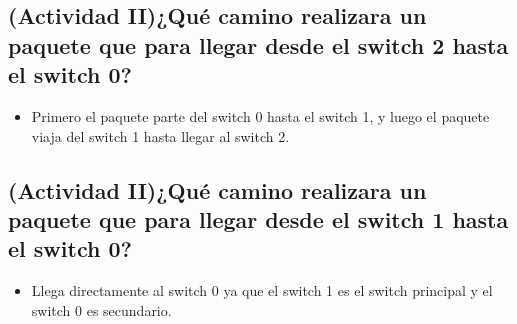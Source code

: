 \documentclass[spanish]{udpreport}
\begin{document}
\subsection{(Actividad II)¿Qué camino realizara un paquete que para llegar desde el switch
2 hasta el switch 0?}
\begin{itemize}
\item Primero el paquete parte del switch 0 hasta el switch 1, y luego el paquete viaja del switch 1 hasta llegar al switch 2.
\end{itemize}
\subsection{(Actividad II)¿Qué camino realizara un paquete que para llegar desde el switch
1 hasta el switch 0?}
\begin{itemize}
\item Llega directamente al switch 0 ya que el switch 1 es el switch principal y el switch 0 es secundario.
\end{itemize}
\end{document}
